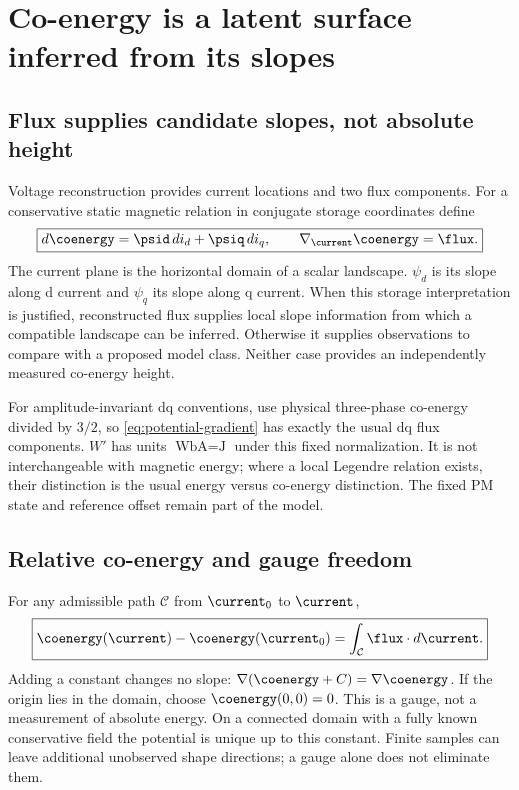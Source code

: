 \section{Co-energy is a latent surface inferred from its slopes}
\label{sec:potential}
\subsection{Flux supplies candidate slopes, not absolute height}
Voltage reconstruction provides current locations and two flux components.
For a conservative static magnetic relation in conjugate storage coordinates define
\begin{equation}
 \boxed{d\coenergy=\psid\,di_d+\psiq\,di_q,\qquad
        \nabla_{\current}\coenergy=\flux.}\label{eq:potential-gradient}
\end{equation}
The current plane is the horizontal domain of a scalar landscape.
$\psi_d$ is its slope along d current and $\psi_q$ its slope along q current.
When this storage interpretation is justified, reconstructed flux supplies
local slope information from which a compatible landscape can be inferred.
Otherwise it supplies observations to compare with a proposed model class.
Neither case provides an
independently measured co-energy height.

For amplitude-invariant dq conventions, use physical three-phase co-energy
divided by $3/2$, so \cref{eq:potential-gradient} has exactly the usual dq
flux components. $W'$ has units $\si{\weber\ampere}=\si{\joule}$ under
this fixed normalization. It is not interchangeable with magnetic energy;
where a local Legendre relation exists, their distinction is the usual energy
versus co-energy distinction. The fixed PM state and reference offset remain
part of the model.


\subsection{Relative co-energy and gauge freedom}
For any admissible path $\mathcal C$ from $\current_0$ to $\current$,
\begin{equation}
 \boxed{\coenergy(\current)-\coenergy(\current_0)
       =\int_{\mathcal C}\flux\cdot d\current.}\label{eq:path-integral}
\end{equation}
Adding a constant changes no slope:
$\nabla(\coenergy+C)=\nabla\coenergy$. If the origin lies in the domain, choose
$\coenergy(0,0)=0$. This is a gauge, not a measurement of absolute energy.
On a connected domain with a fully known conservative field the potential
is unique up to this constant. Finite samples can leave additional unobserved
shape directions; a gauge alone does not eliminate them.

